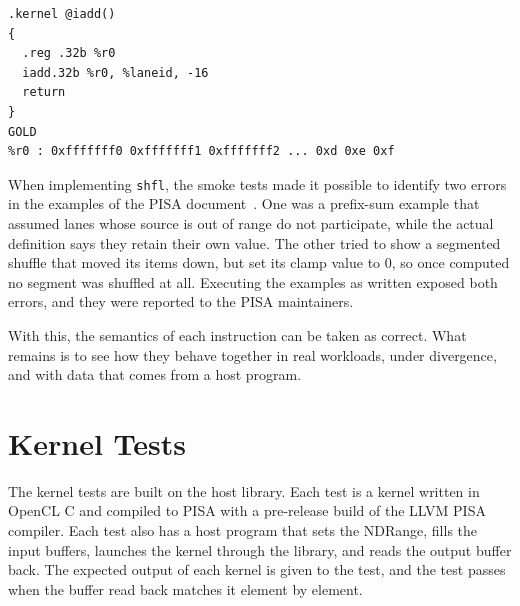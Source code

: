 \begin{lstlisting}[caption={[Smoke test for iadd]Smoke
test for \texttt{iadd.32b}. The kernel is followed by the golden values
of its destination register, one per lane.}, label={lst:smoke-iadd}]
.kernel @iadd()
{
  .reg .32b %r0
  iadd.32b %r0, %laneid, -16
  return
}
GOLD
%r0 : 0xfffffff0 0xfffffff1 0xfffffff2 ... 0xd 0xe 0xf
\end{lstlisting}

When implementing \texttt{shfl}, the smoke tests made it possible to
identify two errors in the examples of the PISA
document~\cite{pisa-spec}. One was a prefix-sum example that assumed
lanes whose source is out of range do not participate, while the
actual definition says they retain their own value. The other tried to show a
segmented shuffle that moved its items down, but set its clamp value to
0, so once computed no segment was shuffled at all. Executing the
examples as written exposed both errors, and they were reported
to the PISA maintainers.

With this, the semantics of each instruction can be taken as correct.
What remains is to see how they behave together in real workloads, under
divergence, and with data that comes from a host program.


\section{Kernel Tests}
\label{sec:eval-results}

The kernel tests are built on the host library. Each test is a kernel
written in OpenCL C and compiled to PISA with a pre-release build of the
LLVM PISA compiler. Each test also has a host program that sets the
NDRange, fills the input buffers, launches the kernel through the
library, and reads the output buffer back. The expected
output of each kernel is given to the test, and the test passes when the
buffer read back matches it element by element.

